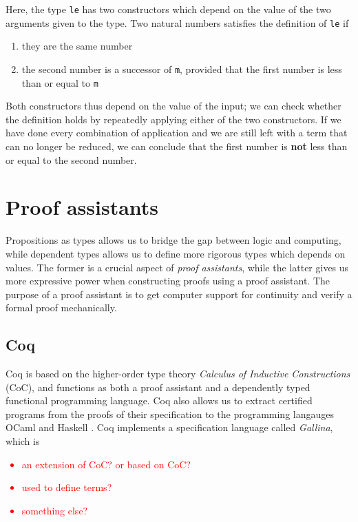 Here, the type \lstinline{le} has two constructors which depend on the value of the two arguments given to the type.
Two natural numbers satisfies the definition of \lstinline{le} if
\begin{enumerate}
    \item they are the same number
    \item the second number is a successor of \lstinline{m},
        provided that the first number is less than or equal to \lstinline{m}
\end{enumerate}

Both constructors thus depend on the value of the input;
we can check whether the definition holds by repeatedly applying
either of the two constructors. If we have done every combination of
application and we are still left with a term that can no longer be reduced,
we can conclude that the first number is \textbf{not} less than or equal to the second number.

\section{Proof assistants}

Propositions as types allows us to bridge the gap between logic and computing,
while dependent types allows us to define more rigorous types which depends on values.
The former is a crucial aspect of \textit{proof assistants}, while the latter gives
us more expressive power when constructing proofs using a proof assistant.
The purpose of a proof assistant is to get computer support for continuity and verify a formal proof mechanically.

\subsection{Coq}
Coq is based on the higher-order type theory \textit{Calculus of Inductive Constructions} (CoC), and
functions as both a proof assistant and a dependently typed functional programming language.
Coq also allows us to extract certified programs from the proofs of their specification to
the programming langauges OCaml and Haskell \cite{cintro}.
Coq implements a specification language called \textit{Gallina}, which is

\textcolor{red}{
    \begin{itemize}
        \item an extension of CoC? or based on CoC?
        \item used to define terms?
        \item something else?
    \end{itemize}
}

